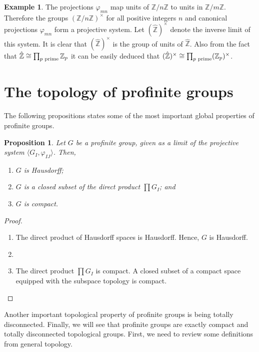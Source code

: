 \documentclass[12pt]{article}
\newtheorem{prop}[thm]{Proposition}
\theoremstyle{definition}
\newtheorem{exm}[thm]{Example}
\theoremstyle{remark}
\newcommand{\zee}{\mathbb{Z}}
\newcommand{\zeehat}{\hat{\mathbb{Z}}}
\begin{document}
    \begin{exm}
        The projections $\varphi_{mn}$ map units of $\zee/n\zee$ to units in $\zee/m\zee$. Therefore the groups $(\zee/n\zee)^\times$ for all positive integers $n$ and canonical projections $\varphi_{mn}$ form a projective system. Let $(\zeehat)^\times$ denote the inverse limit of this system. It is clear that $(\zeehat)^\times$ is the group of units of $\zeehat$. Also from the fact that $\zeehat\cong\prod_{p\textup{ prime}}\zee_p$ it can be easily deduced that $(\zeehat)^\times\cong\prod_{p \textup{ prime}}(\zee_p)^\times$.
    \end{exm}

    \section{The topology of profinite groups}
    
    The following propositions states some of the most important global properties of profinite groups.

    \begin{prop}\label{prop:top}
        Let $G$ be a profinite group, given as a limit of the projective system $\langle G_I,\varphi_{IJ}\rangle$. Then,
        \begin{enumerate}[label=(\alph*)]
            \item $G$ is Hausdorff;
            \item $G$ is a closed subset of the direct product $\prod G_I$; and
            \item\label{prop:top:compact} $G$ is compact.
        \end{enumerate}
    \end{prop}
    \begin{proof}
        \begin{enumerate}[label=(\alph*)]
            \item The direct product of Hausdorff spaces is Hausdorff. Hence, $G$ is Hausdorff.
            \item %
            \item The direct product $\prod G_I$ is compact. A closed subset of a compact space equipped with the subspace topology is compact.
        \end{enumerate}
    \end{proof}

    Another important topological property of profinite groups is being totally disconnected. Finally, we will see that profinite groups are exactly compact and totally disconnected topological groups. First, we need to review some definitions from general topology.
\end{document}
